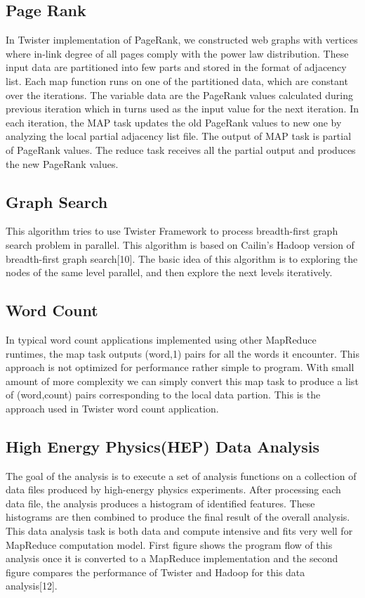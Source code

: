 \documentclass[9pt,twocolumn,twoside]{styles/osajnl}
\begin{document}
\subsection{Page Rank}

In Twister implementation of PageRank, we constructed web graphs with
vertices where in-link degree of all pages comply with the power law
distribution. These input data are partitioned into few parts and
stored in the format of adjacency list. Each map function runs on one
of the partitioned data, which are constant over the iterations. The
variable data are the PageRank values calculated during previous
iteration which in turns used as the input value for the next
iteration. In each iteration, the MAP task updates the old PageRank
values to new one by analyzing the local partial adjacency list
file. The output of MAP task is partial of PageRank values. The reduce
task receives all the partial output and produces the new PageRank
values\cite{twister}.


\subsection{Graph Search}
This algorithm tries to use Twister Framework to process breadth-first
graph search problem in parallel. This algorithm is based on Cailin's
Hadoop version of breadth-first graph search[10]. The basic idea of
this algorithm is to exploring the nodes of the same level parallel,
and then explore the next levels iteratively\cite{twister}.


\subsection{Word Count}

In typical word count applications implemented using other MapReduce
runtimes, the map task outputs (word,1) pairs for all the words it
encounter. This approach is not optimized for performance rather
simple to program. With small amount of more complexity we can simply
convert this map task to produce a list of (word,count) pairs
corresponding to the local data partion. This is the approach used in
Twister word count application\cite{twister}.


\subsection{High Energy Physics(HEP) Data Analysis}

The goal of the analysis is to execute a set of analysis functions on
a collection of data files produced by high-energy physics
experiments. After processing each data file, the analysis produces a
histogram of identified features. These histograms are then combined
to produce the final result of the overall analysis. This data
analysis task is both data and compute intensive and fits very well
for MapReduce computation model. First figure shows the program flow
of this analysis once it is converted to a MapReduce implementation
and the second figure compares the performance of Twister and Hadoop
for this data analysis[12]\cite{twister}.
\end{document}
